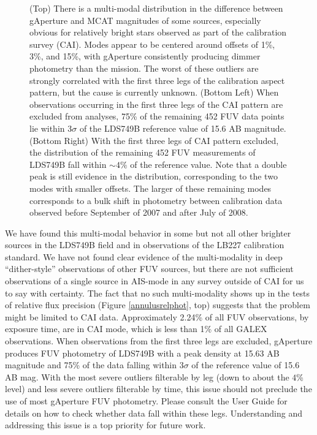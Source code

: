 \documentclass[preprint]{aastex}
\begin{document}
\begin{figure}[h]
\caption{(Top) There is a multi-modal distribution in the difference between gAperture and MCAT magnitudes of some sources, especially obvious for relatively bright stars observed as part of the calibration survey (CAI). Modes appear to be centered around offsets of 1\%, 3\%, and 15\%, with gAperture consistently producing dimmer photometry than the mission. The worst of these outliers are strongly correlated with the first three legs of the calibration aspect pattern, but the cause is currently unknown. (Bottom Left) When observations occurring in the first three legs of the CAI pattern are excluded from analyses, 75\% of the remaining 452 FUV data points lie within 3$\sigma$ of the LDS749B reference value of 15.6 AB magnitude. (Bottom Right) With the first three legs of CAI pattern excluded, the distribution of the remaining 452 FUV measurements of LDS749B fall within $\sim4\%$ of the reference value. Note that a double peak is still evidence in the distribution, corresponding to the two modes with smaller offsets. The larger of these remaining modes corresponds to a bulk shift in photometry between calibration data observed before September of 2007 and after July of 2008.
\label{multimodal}}
\end{figure}
\clearpage

We have found this multi-modal behavior in some but not all other brighter sources in the LDS749B field and in observations of the LB227 calibration standard. We have not found clear evidence of the multi-modality in deep ``dither-style'' observations of other FUV sources, but there are not sufficient observations of a single source in AIS-mode in any survey outside of CAI for us to say with certainty. The fact that no such multi-modality shows up in the tests of relative flux precision (Figure \ref{annulusrelphot}, top) suggests that the problem might be limited to CAI data. Approximately 2.24\% of all FUV observations, by exposure time, are in CAI mode, which is less than 1\% of all GALEX observations. When observations from the first three legs are excluded, gAperture produces FUV photometry of LDS749B with a peak density at 15.63 AB magnitude and 75\% of the data falling within 3$\sigma$ of the reference value of 15.6 AB mag. With the most severe outliers filterable by leg (down to about the $4$\% level) and less severe outliers filterable by time, this issue should not preclude the use of most gAperture FUV photometry. Please consult the User Guide for details on how to check whether data fall within these legs. Understanding and addressing this issue is a top priority for future work.
\end{document}
